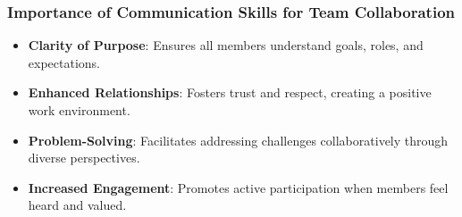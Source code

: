 \documentclass[aspectratio=169]{beamer}
\begin{document}
\begin{frame}[fragile]
    \frametitle{Importance of Communication Skills for Team Collaboration}

    \begin{itemize}
        \item \textbf{Clarity of Purpose}: Ensures all members understand goals, roles, and expectations.
        \item \textbf{Enhanced Relationships}: Fosters trust and respect, creating a positive work environment.
        \item \textbf{Problem-Solving}: Facilitates addressing challenges collaboratively through diverse perspectives.
        \item \textbf{Increased Engagement}: Promotes active participation when members feel heard and valued.
    \end{itemize}
\end{frame}
\end{document}
